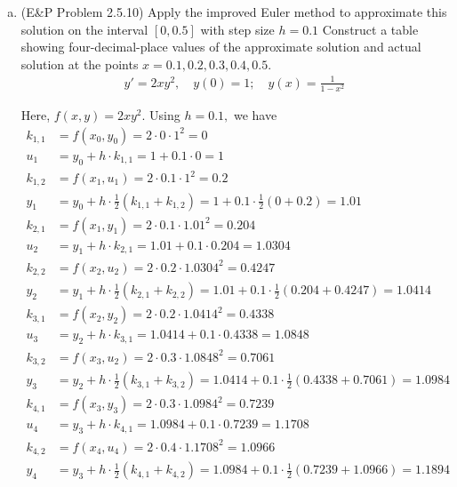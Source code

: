 \documentclass{article}
\begin{document}
\begin{enumerate}
\begin{enumerate}[(a)]
				\newpage
			\item (E\&P Problem 2.5.10) Apply the improved Euler method to approximate this solution on the interval $[0, 0.5]$ with step size $h=0.1$ Construct a table showing four-decimal-place values of the approximate solution and actual solution at the points $x=0.1, 0.2, 0.3, 0.4, 0.5.$
				\begin{align*}
					y'=2xy^2, \quad y(0)=1; \quad y(x)=\frac{1}{1-x^2}
				\end{align*}
				\begin{soln}
					Here, $f(x, y)=2xy^2.$ Using $h=0.1,$ we have
					\begin{align*}
						k_{1, 1} &= f(x_0, y_0) = 2\cdot 0\cdot 1^2 = 0 \\
						u_1 &= y_0 + h\cdot k_{1, 1} = 1 + 0.1\cdot 0 = 1 \\
						k_{1, 2} &= f(x_1, u_1) = 2\cdot 0.1\cdot 1^2 = 0.2 \\
						y_1 &= y_0 + h\cdot \frac{1}{2}\left( k_{1, 1}+k_{1, 2} \right) = 1 + 0.1\cdot \frac{1}{2}(0+0.2) = 1.01 \\
						k_{2, 1} &= f(x_1, y_1) = 2\cdot 0.1\cdot 1.01^2 = 0.204 \\
						u_2 &= y_1 + h\cdot k_{2, 1} = 1.01 + 0.1\cdot 0.204 = 1.0304 \\
						k_{2, 2} &= f(x_2, u_2) = 2\cdot 0.2\cdot 1.0304^2 = 0.4247 \\
						y_2 &= y_1 + h\cdot \frac{1}{2}\left( k_{2, 1} + k_{2, 2} \right) = 1.01 + 0.1\cdot \frac{1}{2}\left( 0.204+0.4247 \right) = 1.0414 \\
						k_{3, 1} &= f(x_2, y_2) = 2\cdot 0.2\cdot 1.0414^2 = 0.4338 \\
						u_3 &= y_2 + h\cdot k_{3, 1} = 1.0414+0.1\cdot 0.4338 = 1.0848 \\
						k_{3, 2} &= f(x_3, u_2) = 2\cdot 0.3\cdot 1.0848^2 = 0.7061 \\
						y_3 &= y_2 + h\cdot \frac{1}{2}\left( k_{3, 1} + k_{3, 2} \right) = 1.0414 + 0.1\cdot \frac{1}{2}\left( 0.4338 + 0.7061 \right) = 1.0984 \\
						k_{4, 1} &= f(x_3, y_3) = 2\cdot 0.3\cdot 1.0984^2 = 0.7239 \\
						u_4 &= y_3 + h\cdot k_{4, 1} = 1.0984 + 0.1\cdot 0.7239 = 1.1708 \\
						k_{4, 2} &= f(x_4, u_4) = 2\cdot 0.4\cdot 1.1708^2 = 1.0966 \\
						y_4 &= y_3 + h\cdot \frac{1}{2}\left( k_{4, 1} + k_{4, 2} \right) = 1.0984 + 0.1\cdot \frac{1}{2}\left( 0.7239 + 1.0966 \right) = 1.1894 \\

\end{align*}
\end{soln}
\end{enumerate}
\end{enumerate}
\end{document}
